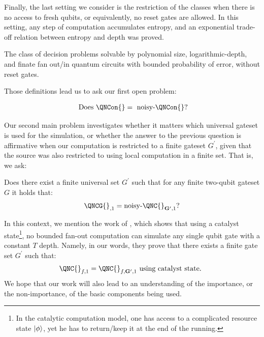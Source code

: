 Finally, the last setting we consider is the restriction of the classes when there is no access to fresh qubits, or equivalently, no reset gates are allowed. In this setting, any step of computation accumulates entropy, and an exponential trade-off relation between entropy and depth was proved.

\begin{definition}
  The class of decision problems solvable by polynomial size,  logarithmic-depth, and finate fan out/in quantum circuits with bounded probability of error, without reset gates.
\end{definition}
Those definitions lead us to ask our first open problem:
\begin{oproblem}
\begin{equation*}
  \begin{split}
    \text{ Does }  \QNCon{} = \text{ noisy-}\QNCon{} \text{?}
  \end{split}
\end{equation*}
\end{oproblem}
Our second main problem investigates whether it matters which universal gateset is used for the simulation, or whether the answer to the previous question is affirmative when our computation is restricted to a finite gateset $G^{\prime}$, given that the source was also restricted to using local computation in a finite set. That is, we ask: \begin{oproblem}
  Does there exist a finite universal set $G^{\prime}$ such that for any finite two-qubit gateset $G$ it holds that:
\begin{equation*}
  \begin{split}
\QNCG{}_{,1} = \text{noisy-}\QNC{}_{\mathbf{G^{\prime}}, 1} \text{?}
  \end{split}
\end{equation*}
\end{oproblem}

In this context, we mention the work of \cite{kim2025catalyticzrotationsconstanttdepth}, which shows that using a catalyst state\footnote{In the catalytic computation model, one has access to a complicated resource state $\ket{\phi}$, yet he has to return/keep it at the end of the running.}, no bounded fan-out computation can simulate any single qubit gate with a constant $T$ depth. Namely, in our words, they prove that there exists a finite gate set $G^{\prime}$ such that:
\begin{equation*}
  \begin{split}
    \QNC{}_{f,1} = \QNC{}_{f, \mathbf{G^{\prime}}, 1} \text{ using catalyst state. }
  \end{split}
\end{equation*}
We hope that our work will also lead to an understanding of the importance, or the non-importance, of the basic components being used.


\fi
